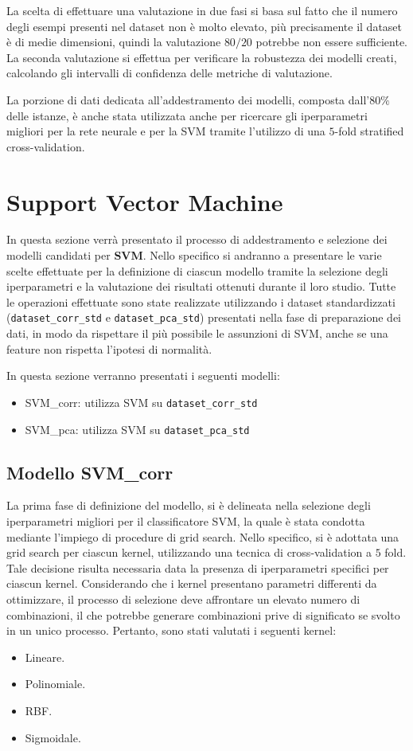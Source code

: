 La scelta di effettuare una valutazione in due fasi si basa sul fatto che il
numero degli esempi presenti nel dataset non è molto elevato, più precisamente
il dataset è di medie dimensioni, quindi la valutazione $80/20$ potrebbe non
essere sufficiente. La seconda valutazione si effettua per verificare la
robustezza dei modelli creati, calcolando gli intervalli di confidenza delle
metriche di valutazione.

La porzione di dati dedicata all'addestramento dei modelli, composta dall'$80\%$
delle istanze, è anche stata utilizzata anche per ricercare gli iperparametri
migliori per la rete neurale e per la SVM tramite l'utilizzo di una $5$-fold 
stratified cross-validation.
\section{Support Vector Machine}
In questa sezione verrà presentato il processo di addestramento e selezione dei
modelli candidati per \textbf{SVM}. Nello specifico si andranno a presentare le
varie scelte effettuate per la definizione di ciascun modello tramite la selezione
degli iperparametri e la valutazione dei risultati ottenuti durante il loro studio.
Tutte le operazioni effettuate sono state realizzate utilizzando i dataset standardizzati
(\texttt{dataset\_corr\_std} e \texttt{dataset\_pca\_std}) presentati nella fase
di preparazione dei dati, in modo da rispettare il più possibile le assunzioni
di SVM, anche se una feature non rispetta l'ipotesi di normalità.

In questa sezione verranno presentati i seguenti modelli:
\begin{itemize}
    \item SVM\_corr: utilizza SVM su \texttt{dataset\_corr\_std}
    \item SVM\_pca: utilizza SVM su \texttt{dataset\_pca\_std}
\end{itemize}

\subsection{Modello SVM\_corr}
La prima fase di definizione del modello, si è delineata nella selezione degli
iperparametri migliori per il classificatore SVM, la quale è stata
condotta mediante l'impiego di procedure di grid search. Nello specifico, si è
adottata una grid search per ciascun kernel, utilizzando una tecnica di
cross-validation a $5$ fold. Tale decisione risulta necessaria data la presenza
di iperparametri specifici per ciascun kernel. Considerando che i
kernel presentano parametri differenti da ottimizzare, il processo di selezione
deve affrontare un elevato numero di combinazioni, il che potrebbe generare
combinazioni prive di significato se svolto in un unico processo. Pertanto, sono
stati valutati i seguenti kernel:
\begin{itemize}
    \item Lineare.
    \item Polinomiale.
    \item RBF.
    \item Sigmoidale.
\end{itemize}

